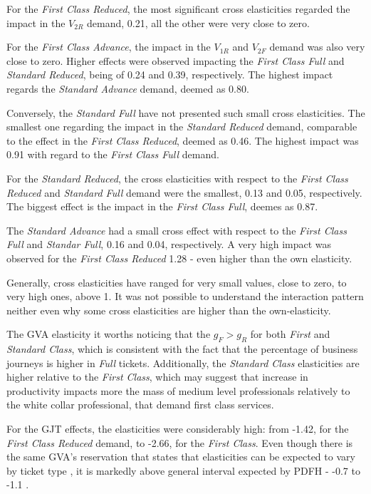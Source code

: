 For the \textit{First Class Reduced}, the most significant cross elasticities regarded the impact in the $V_{2R}$ demand, 0.21, all the other were very close to zero.

For the \textit{First Class Advance}, the impact in the $V_{1R}$ and $V_{2F}$ demand was also very close to zero. Higher effects were observed impacting the \textit{First Class Full} and \textit{Standard Reduced}, being of 0.24 and 0.39, respectively. The highest impact regards the \textit{Standard Advance} demand, deemed as 0.80.

Conversely, the \textit{Standard Full} have not presented such small cross elasticities. The smallest one regarding the impact in the \textit{Standard Reduced} demand, comparable to the effect in the \textit{First Class Reduced}, deemed as 0.46. The highest impact was 0.91 with regard to the \textit{First Class Full} demand.

For the \textit{Standard Reduced}, the cross elasticities with respect to the \textit{First Class Reduced} and \textit{Standard Full} demand were the smallest, 0.13 and 0.05, respectively. The biggest effect is the impact in the \textit{First Class Full}, deemes as 0.87.

The \textit{Standard Advance} had a small cross effect with respect to the \textit{First Class Full} and \textit{Standar Full}, 0.16 and 0.04, respectively. A very high impact was observed for the \textit{First Class Reduced} 1.28 - even higher than the own elasticity.

Generally, cross elasticities have ranged for very small values, close to zero, to very high ones, above 1. It was not possible to understand the interaction pattern neither even why some cross elasticities are higher than the own-elasticity.

The GVA elasticity it worths noticing that the $g_{F} > g_{R}$ for both \textit{First} and \textit{Standard Class}, which is consistent with the fact that the percentage of business journeys is higher in \textit{Full} tickets. Additionally, the \textit{Standard Class} elasticities are higher relative to the \textit{First Class}, which may suggest that increase in productivity impacts more the mass of medium level professionals relatively to the white collar professional, that demand first class services. 

For the GJT effects, the elasticities were considerably high: from -1.42, for the \textit{First Class Reduced} demand, to -2.66, for the \textit{First Class}. Even though there is the same GVA's reservation that states that elasticities can be expected to vary by ticket type \citep{pdfh}, it is markedly above general interval expected by PDFH - -0.7 to -1.1 \citep{pdfhv5}.
